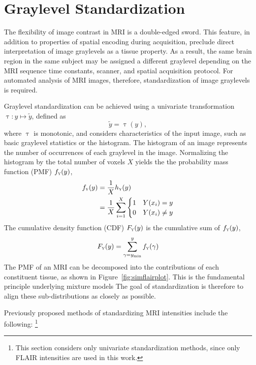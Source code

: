 \section{Graylevel Standardization}\label{s:pre-ystd}
The flexibility of image contrast in MRI is a double-edged sword.
This feature, in addition to properties of spatial encoding during acquisition,
preclude direct interpretation of image graylevels as a tissue property.
As a result, the same brain region in the same subject may be assigned a different graylevel
depending on the MRI sequence time constants, scanner, and spatial acquisition protocol.
For automated analysis of MRI images, therefore, standardization of image graylevels is required.
\par
Graylevel standardization can be achieved using a univariate transformation
$\uptau:y\mapsto\tilde{y}$, defined as
\begin{equation}
\tilde{y} = \uptau(y),
\end{equation}
where $\uptau$ is monotonic, and considers characteristics of the input image,
such as basic graylevel statistics or the histogram.
The histogram of an image represents the number of occurrences of each graylevel in the image.
Normalizing the histogram by the total number of voxels $X$
yields the the probability mass function (PMF) $f_{\textsc{y}}(y)$,
\begin{align}
f_{\textsc{y}}(y) &= \frac{1}{X}h_{\textsc{y}}(y)\nonumber\\
&= \frac{1}{X}\sum_{i=1}^{X}
\begin{cases}
1&Y(x_i) = y\\
0&Y(x_i) \ne y\\
\end{cases}
\end{align}
The cumulative density function (CDF) $F_{\textsc{y}}(y)$ is the cumulative sum of $f_{\textsc{y}}(y)$,
\begin{equation}
F_{\textsc{y}}(y) = \sum_{\gamma=y_{\min}}^{y} f_{\textsc{y}}(\gamma)
\end{equation}
The PMF of an MRI can be decomposed into the contributions of each constituent tissue,
as shown in Figure~\ref{fig:simflairplot}.
This is the fundamental principle underlying mixture models%
The goal of standardization is therefore to align these sub-distributions as closely as possible.
\par
Previously proposed methods of standardizing MRI intensities include the following:%
\footnote{This section considers only univariate standardization methods,
  since only FLAIR intensities are used in this work.}
